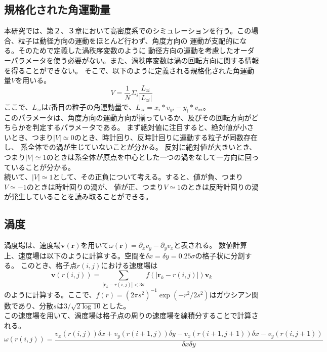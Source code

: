 \documentclass[/Users/ikedahajime/GitHub/reserch/master_report/thesis]{subfiles}
\begin{document}
\subsection{規格化された角運動量}
本研究では、第２、３章において高密度系でのシミュレーションを行う。この場合、粒子は動径方向の運動をほとんど行わず、角度方向の
運動が支配的になる。そのためで定義した渦秩序変数のように
動径方向の運動を考慮したオーダーパラメータを使う必要がない。また、渦秩序変数は渦の回転方向に関する情報を得ることができない。
そこで、以下のように定義される規格化された角運動量$V$\cite{jiangEmergenceCollectiveDynamical2017,capriniCollectiveEffectsConfined2021}を用いる。
\begin{equation}
    V=\frac{1}{N}\Sigma_i \frac{L_{zi}}{ |L_{zi}|}
\end{equation}
ここで、$L_{zi}$は$i$番目の粒子の角運動量で、$L_{zi}=x_i*v_{yi}-y_i*v_{xi}$。\\
このパラメータは、角度方向の運動方向が揃っているか、及びその回転方向がどちらかを判定するパラメータである。
まず絶対値に注目すると、絶対値が小さいとき、つまり$|V|\simeq 0$のとき、時計回り、反時計回りに運動する粒子が同数存在し、
系全体での渦が生じていないことが分かる。
反対に絶対値が大きいとき、つまり$|V|\simeq 1$のときは系全体が原点を中心とした一つの渦をなして一方向に回っていることが分かる。\\
続いて、$|V|\simeq 1$として、その正負について考える。すると、値が負、つまり$V\simeq -1$のときは時計回りの渦が、
値が正、つまり$V\simeq 1$のときは反時計回りの渦が発生していることを読み取ることができる。

\subsection{渦度}\label{subsec:def_vortex}
渦度場は、速度場$\bm{v}(\bm{r})$を用いて$\omega(\bm{r})=\partial_x v_y -\partial_y v_x$と表される。
数値計算上、速度場は以下のように計算する。空間を$\delta x=\delta y=0.25 \sigma$の格子状に分割する。
このとき、格子点$r(i,j)$における速度場は%
\begin{equation}\label{eq:valocity_field}
    \bm{v}(r(i,j))=\sum_{\left|\bm{r}_k-r(i,j)\right|<3\sigma} f(\left|\bm{r}_k-r(i,j)\right|)\bm{v}_k
\end{equation}
のように計算する。ここで、$f(r)=(2\pi s^2)^{-1} \exp(-r^2/2s^2)$はガウシアン関数であり、分散$s$は$3/\sqrt{2\log 10}$とした。\\
この速度場を用いて、渦度場は格子点の周りの速度場を線積分することで計算される。
\begin{equation}
    \omega (r(i,j))=\frac{v_x(r(i,j))\delta x +v_y(r(i+1,j)) \delta y -v_x(r(i+1,j+1))\delta x -v_y(r(i,j+1))}{\delta x \delta y}
\end{equation}
\end{document}
